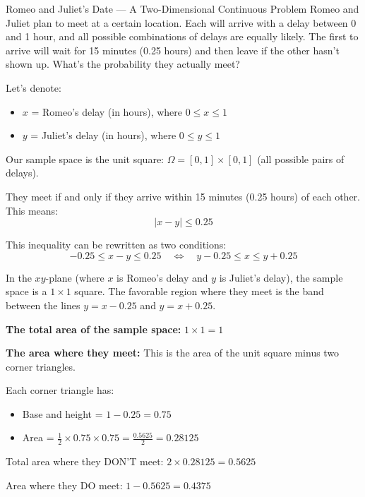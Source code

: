 \begin{exampleboxbreak}{Romeo and Juliet's Date — A Two-Dimensional Continuous Problem}
Romeo and Juliet plan to meet at a certain location. Each will arrive with a delay between 0 and 1 hour, and all possible combinations of delays are equally likely. The first to arrive will wait for 15 minutes (0.25 hours) and then leave if the other hasn't shown up. What's the probability they actually meet?


Let's denote:
\begin{itemize}
    \item $x$ = Romeo's delay (in hours), where $0 \leq x \leq 1$
    \item $y$ = Juliet's delay (in hours), where $0 \leq y \leq 1$
\end{itemize}

Our sample space is the unit square: $\Omega = [0,1] \times [0,1]$ (all possible pairs of delays).


They meet if and only if they arrive within 15 minutes (0.25 hours) of each other. This means:
\[
|x - y| \leq 0.25
\]

This inequality can be rewritten as two conditions:
\[
-0.25 \leq x - y \leq 0.25 \quad \Longleftrightarrow \quad y - 0.25 \leq x \leq y + 0.25
\]


In the $xy$-plane (where $x$ is Romeo's delay and $y$ is Juliet's delay), the sample space is a $1 \times 1$ square. The favorable region where they meet is the band between the lines $y = x - 0.25$ and $y = x + 0.25$.

\textbf{The total area of the sample space:} $1 \times 1 = 1$

\textbf{The area where they meet:} This is the area of the unit square minus two corner triangles.

Each corner triangle has:
\begin{itemize}
    \item Base and height = $1 - 0.25 = 0.75$
    \item Area = $\frac{1}{2} \times 0.75 \times 0.75 = \frac{0.5625}{2} = 0.28125$
\end{itemize}

Total area where they DON'T meet: $2 \times 0.28125 = 0.5625$

Area where they DO meet: $1 - 0.5625 = 0.4375$


\end{exampleboxbreak}
